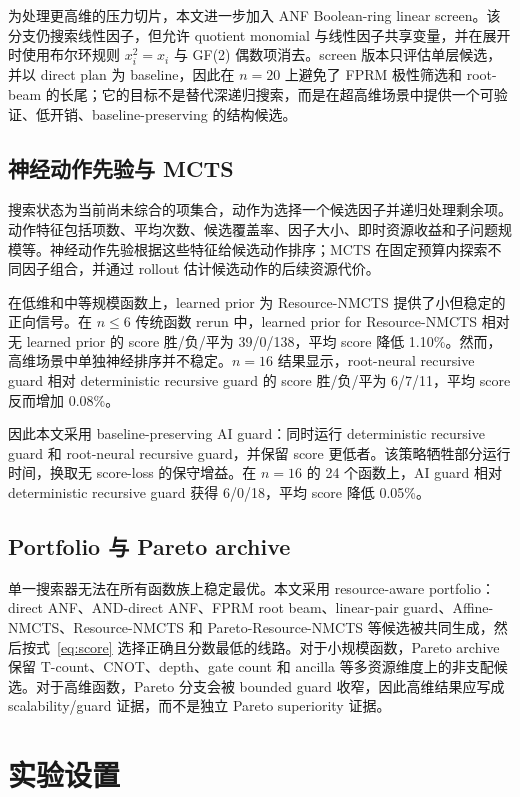 \documentclass[UTF8,fontset=macnew,11pt]{ctexart}
\newcommand{\method}{Resource-NMCTS}
\newcommand{\pareto}{Pareto-Resource-NMCTS}
\newcommand{\mcts}{\ensuremath{\mathrm{MCTS}}}
\begin{document}
为处理更高维的压力切片，本文进一步加入 ANF Boolean-ring linear screen。该分支仍搜索线性因子，但允许 quotient monomial 与线性因子共享变量，并在展开时使用布尔环规则 $x_i^2=x_i$ 与 GF(2) 偶数项消去。screen 版本只评估单层候选，并以 direct plan 为 baseline，因此在 $n=20$ 上避免了 FPRM 极性筛选和 root-beam 的长尾；它的目标不是替代深递归搜索，而是在超高维场景中提供一个可验证、低开销、baseline-preserving 的结构候选。

\subsection{神经动作先验与 MCTS}

搜索状态为当前尚未综合的项集合，动作为选择一个候选因子并递归处理剩余项。动作特征包括项数、平均次数、候选覆盖率、因子大小、即时资源收益和子问题规模等。神经动作先验根据这些特征给候选动作排序；\mcts{} 在固定预算内探索不同因子组合，并通过 rollout 估计候选动作的后续资源代价。

在低维和中等规模函数上，learned prior 为 \method{} 提供了小但稳定的正向信号。在 $n\leq6$ 传统函数 rerun 中，learned prior for \method{} 相对无 learned prior 的 score 胜/负/平为 39/0/138，平均 score 降低 1.10\%。然而，高维场景中单独神经排序并不稳定。$n=16$ 结果显示，root-neural recursive guard 相对 deterministic recursive guard 的 score 胜/负/平为 6/7/11，平均 score 反而增加 0.08\%。

因此本文采用 baseline-preserving AI guard：同时运行 deterministic recursive guard 和 root-neural recursive guard，并保留 score 更低者。该策略牺牲部分运行时间，换取无 score-loss 的保守增益。在 $n=16$ 的 24 个函数上，AI guard 相对 deterministic recursive guard 获得 6/0/18，平均 score 降低 0.05\%。

\subsection{Portfolio 与 Pareto archive}

单一搜索器无法在所有函数族上稳定最优。本文采用 resource-aware portfolio：direct ANF、AND-direct ANF、FPRM root beam、linear-pair guard、Affine-NMCTS、\method{} 和 \pareto{} 等候选被共同生成，然后按式~\eqref{eq:score} 选择正确且分数最低的线路。对于小规模函数，Pareto archive 保留 T-count、CNOT、depth、gate count 和 ancilla 等多资源维度上的非支配候选。对于高维函数，Pareto 分支会被 bounded guard 收窄，因此高维结果应写成 scalability/guard 证据，而不是独立 Pareto superiority 证据。

\section{实验设置}
\end{document}
